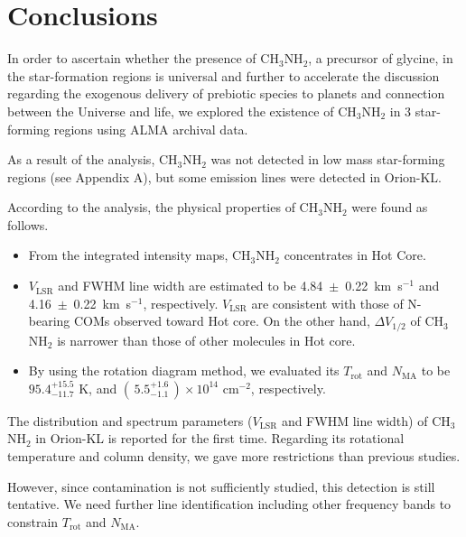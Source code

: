 \chapter{Conclusions
  \label{chap:conclusions}}

In order to ascertain whether the presence of CH$_3$NH$_2$, a precursor of glycine, in the star-formation regions is universal  
 and further to accelerate the discussion regarding the exogenous delivery of 
prebiotic species to planets and connection between the Universe and life,
we explored the existence of CH$_3$NH$_2$ in 3 star-forming regions using ALMA archival data.

As a result of the analysis, CH$_3$NH$_2$ was not detected in low mass star-forming regions 
(see Appendix A), but some emission lines were detected in Orion-KL.

According to the analysis, the physical properties of CH$_3$NH$_2$ were found as follows.
\begin{itemize}
\item From the integrated intensity maps, CH$_3$NH$_2$ concentrates in Hot Core.
\item $V_{\mathrm{LSR}}$ and FWHM line width are estimated to be 4.84~$\pm$~0.22~km~s$^{-1}$ 
and 4.16~$\pm$~0.22~km~s$^{-1}$, respectively. $V_{\mathrm{LSR}}$ are consistent with 
those of N-bearing COMs observed toward Hot core.
On the other hand, $\Delta V_{1/2}$ of CH$_3$NH$_2$ is narrower than those of other molecules in Hot core.
\item By using the rotation diagram method, we evaluated its $T_{\mathrm{rot}}$ and $N_{\mathrm{MA}}$ to be $95.4^{+15.5}_{-11.7} \,\,\mathrm{K}$, and $ (\,5.5^{+1.6}_{-1.1}\,) \times 10^{14} \,\,\mathrm{cm^{-2}}$,  respectively.
\end{itemize}

The distribution and spectrum parameters ($V_{\mathrm{LSR}}$ and FWHM line width) of CH$_3$NH$_2$ in Orion-KL is reported for the first time.
Regarding its rotational temperature and column density, we gave more restrictions than previous studies.

However, since contamination is not sufficiently studied, this detection is still tentative.
We need further line identification including other frequency bands to constrain $T_{\mathrm{rot}}$ and $N_{\mathrm{MA}}$.



